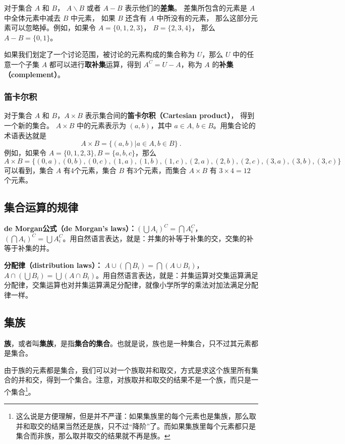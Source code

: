 对于集合 $A$ 和 $B$， $A\backslash B$ 或者 $A-B$ 表示他们的\textbf{差集}。 差集所包含的元素是 $A$ 中全体元素中减去 $B$ 中元素， 如果 $B$ 还含有 $A$ 中所没有的元素， 那么这部分元素可以忽略掉。例如，如果令 $A=\{0,1,2,3\}$， $B=\{2,3,4\}$， 那么 $A-B=\{0,1\}$。

如果我们划定了一个讨论范围，被讨论的元素构成的集合称为 $U$，那么 $U$ 中的任意一个子集 $A$ 都可以进行\textbf{取补集}运算，得到 $A^C=U-A$，称为 $A$ 的\textbf{补集（complement）}。

\subsubsection{笛卡尔积}
对于集合 $A$ 和 $B$，$A\times B$ 表示集合间的\textbf{笛卡尔积（Cartesian product）}， 得到一个新的集合。 $A\times B$ 中的元素表示为 $(a,b)$，其中 $a\in A$, $b\in B$。用集合论的术语表达就是
\begin{equation}\label{eq_Set_1}
A\times B=\{(a,b)|a\in A, b\in B\}~.
\end{equation}
例如，如果令 $A=\{0,1,2,3\}, B=\{a, b, c\}$，那么
\begin{equation}
A\times B=\{ (0,a),(0,b),(0,c),(1,a),(1,b),(1,c),(2,a),(2,b),(2,c),(3,a),(3,b),(3,c) \}
\end{equation}
可以看到，集合 $A$ 有4个元素，集合 $B$ 有3个元素，而集合 $A\times B$ 有 $3\times4 = 12$ 个元素。

\subsection{集合运算的规律}

\textbf{de Morgan公式（de Morgan's laws）：}$(\bigcup A_i)^C=\bigcap A_i^C$，$(\bigcap A_i)^C=\bigcup A_i^C$。用自然语言表达，就是：并集的补等于补集的交，交集的补等于补集的并。

\textbf{分配律（distribution laws）：} $A\cup(\bigcap B_i)=\bigcap (A\cup B_i)$，$A\cap(\bigcup B_i)=\bigcup (A\cap B_i)$。用自然语言表达，就是：并集运算对交集运算满足分配律，交集运算也对并集运算满足分配律，就像小学所学的乘法对加法满足分配律一样。


\subsection{集族}

\textbf{族}，或者叫\textbf{集族}，是指\textbf{集合的集合}。也就是说，族也是一种集合，只不过其元素都是集合。

由于族的元素都是集合，我们可以对一个族取并和取交，方式是求这个族里所有集合的并和交，得到一个集合。注意，对族取并和取交的结果不是一个族，而只是一个集合\footnote{这么说是方便理解，但是并不严谨：如果集族里的每个元素也是集族，那么取并和取交的结果当然还是族，只不过“降阶”了。而如果集族里每个元素都只是集合而非族，那么取并取交的结果就不再是族。}。

